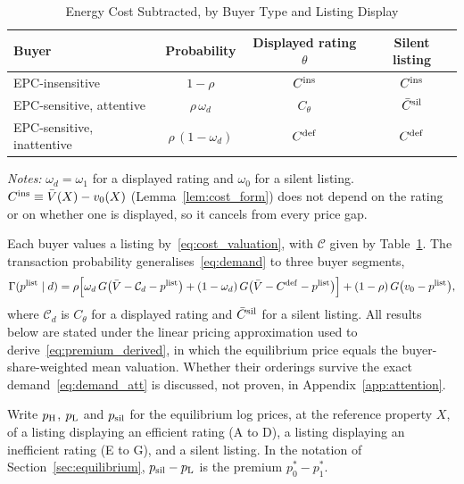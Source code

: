 \begin{table}[htbp]
\centering
\caption{Energy Cost Subtracted, by Buyer Type and Listing Display}
\label{tab:att_buyers}
\small\renewcommand{\arraystretch}{1.5}
\begin{tabular*}{\textwidth}{@{\extracolsep{\fill}}lccc@{}}
\toprule\toprule
\textbf{Buyer} & \textbf{Probability} & \textbf{Displayed rating $\theta$} & \textbf{Silent listing} \\
\midrule
EPC-insensitive & $1-\rho$ & $C^{\rm ins}$ & $C^{\rm ins}$ \\
EPC-sensitive, attentive & $\rho\,\omega_d$ & $C_\theta$ & $\bar C^{\rm sil}$ \\
EPC-sensitive, inattentive & $\rho\,(1-\omega_d)$ & $C^{\rm def}$ & $C^{\rm def}$ \\
\bottomrule\bottomrule
\end{tabular*}

\vspace{0.5em}
\raggedright
\footnotesize
\textit{Notes:} $\omega_d=\omega_1$ for a displayed rating and $\omega_0$ for a silent listing. $C^{\rm ins}\equiv\bar V(X)-v_0(X)$ (Lemma~\ref{lem:cost_form}) does not depend on the rating or on whether one is displayed, so it cancels from every price gap.
\end{table}

Each buyer values a listing by~\eqref{eq:cost_valuation}, with $\mathcal C$ given by Table~\ref{tab:att_buyers}. The transaction probability generalises~\eqref{eq:demand} to three buyer segments,
\begin{equation}
    \Gamma(p^{\rm list}\mid d)=\rho\Big[\omega_d\,G\big(\bar V-\mathcal C_d-p^{\rm list}\big)+(1-\omega_d)\,G\big(\bar V-C^{\rm def}-p^{\rm list}\big)\Big]+(1-\rho)\,G\big(v_0-p^{\rm list}\big),
    \label{eq:demand_att}
\end{equation}
where $\mathcal C_d$ is $C_\theta$ for a displayed rating and $\bar C^{\rm sil}$ for a silent listing. All results below are stated under the linear pricing approximation used to derive~\eqref{eq:premium_derived}, in which the equilibrium price equals the buyer-share-weighted mean valuation. Whether their orderings survive the exact demand~\eqref{eq:demand_att} is discussed, not proven, in Appendix~\ref{app:attention}.

Write $p_{\rm H}$, $p_{\rm L}$ and $p_{\rm sil}$ for the equilibrium log prices, at the reference property $X$, of a listing displaying an efficient rating (A to D), a listing displaying an inefficient rating (E to G), and a silent listing. In the notation of Section~\ref{sec:equilibrium}, $p_{\rm sil}-p_{\rm L}$ is the premium $p_0^*-p_1^*$.


